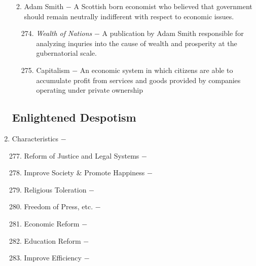 \documentclass[12pt]{article}
\begin{document}
\begin{enumerate}
\begin{enumerate}[label=\arabic{*}.]
\begin{enumerate}[label=\arabic{*}.]
\end{enumerate}
\setcounter{enumii}{272}

\item Adam Smith $-$ A Scottish born economist who believed that government should remain neutrally indifferent with respect to economic issues.

\begin{enumerate}[label=\arabic{*}.]
\setcounter{enumiii}{273}

\item \textit{Wealth of Nations} $-$ A publication by Adam Smith responsible for analyzing inquries into the cause of wealth and prosperity at the gubernatorial scale.

\item Capitalism $-$ An economic system in which citizens are able to accumulate profit from services and goods provided by companies operating under private ownership

\end{enumerate}

\end{enumerate}
\setcounter{enumi}{275}

\subsection{Enlightened Despotism}

\item Characteristics $-$

\begin{enumerate}[label=\arabic{*}.]
\setcounter{enumii}{276}

\item Reform of Justice and Legal Systems $-$ 

\item Improve Society \& Promote Happiness $-$

\item Religious Toleration $-$

\item Freedom of Press, etc. $-$ 

\item Economic Reform $-$ 

\item Education Reform $-$ 

\item Improve Efficiency $-$ 


\end{enumerate}
\setcounter{enumi}{283}


\end{enumerate}
\end{document}
